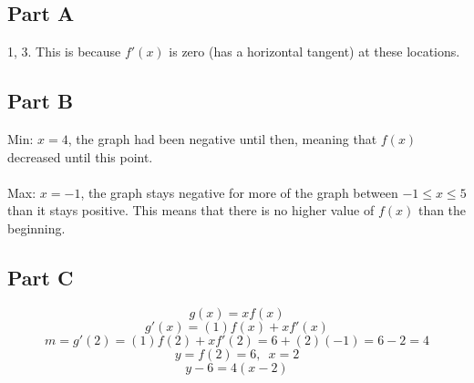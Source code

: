 
\subsection{Part A}
1, 3. This is because $f'(x)$ is zero (has a horizontal tangent) at these locations.

\subsection{Part B}
Min: $x = 4$, the graph had been negative until then, meaning that $f(x)$ decreased until this point. \\ \\
Max: $x = -1$, the graph stays negative for more of the graph between $-1 \leq x \leq 5$ than it stays positive. This means that there is no higher value of $f(x)$ than the beginning.

\subsection{Part C}
\[ g(x) = xf(x) \]
\[ g'(x) = (1)f(x) + xf'(x) \]
\[ m = g'(2) = (1)f(2) + xf'(2) = 6 + (2)(-1) = 6 - 2 = 4 \]
\[ y = f(2) = 6, \enspace x = 2 \]
\[ y - 6 = 4 (x - 2) \]
